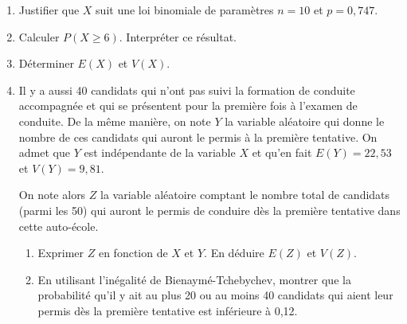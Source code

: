 		\begin{enumerate}
			\item Justifier que $X$ suit une loi binomiale de paramètres $n=10$ et $p=0,747$.

			\item Calculer $P(X \geqslant 6)$. Interpréter ce résultat.

			\item Déterminer $E(X)$ et $V(X)$.

			\item Il y a aussi 40 candidats qui n'ont pas suivi la formation de conduite accompagnée et qui se présentent pour la première fois à l'examen de conduite. De la même manière, on note $Y$ la variable aléatoire qui donne le nombre de ces candidats qui auront le permis à la première tentative. On admet que $Y$ est indépendante de la variable $X$ et qu'en fait $E(Y)=22,53$ et $V(Y)=9,81$.

			\medskip

			On note alors $Z$ la variable aléatoire comptant le nombre total de candidats (parmi les 50) qui auront le permis de conduire dès la première tentative dans cette auto-école.

			\medskip

			\begin{enumerate}
				\item Exprimer $Z$ en fonction de $X$ et $Y$. En déduire $E(Z)$ et $V(Z)$.

				\item En utilisant l'inégalité de Bienaymé-Tchebychev, montrer que la probabilité qu'il y ait au plus 20 ou au moins  40 candidats qui aient leur permis dès la première tentative est inférieure à 0,12.
			\end{enumerate}
		\end{enumerate}

\bigskip
